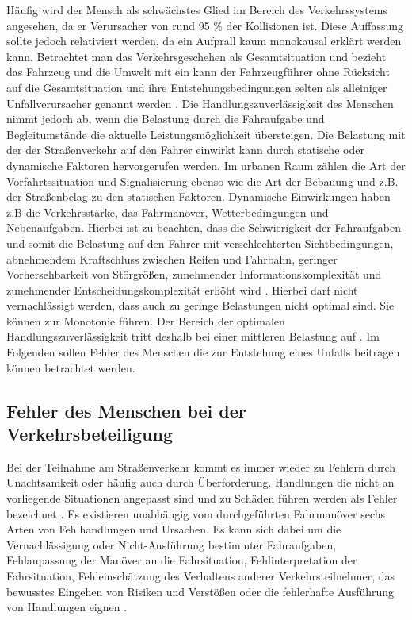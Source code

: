 Häufig wird der Mensch als schwächstes Glied im Bereich des Verkehrssystems angesehen, da er Verursacher von rund 95 \% der Kollisionen ist. Diese Auffassung sollte jedoch relativiert werden, da ein Aufprall kaum monokausal erklärt werden kann. Betrachtet man das Verkehrsgeschehen als Gesamtsituation und bezieht das Fahrzeug und die Umwelt mit ein kann der Fahrzeugführer ohne Rücksicht auf die Gesamtsituation und ihre Entstehungsbedingungen selten als alleiniger Unfallverursacher genannt werden \parencite[S. 269]{Burg.2017}. Die Handlungszuverlässigkeit des Menschen nimmt jedoch ab, wenn die Belastung durch die Fahraufgabe und Begleitumstände die aktuelle Leistungsmöglichkeit übersteigen. Die Belastung mit der der Straßenverkehr auf den Fahrer einwirkt kann durch statische oder dynamische Faktoren hervorgerufen werden. Im urbanen Raum zählen die Art der Vorfahrtssituation und Signalisierung ebenso wie die Art der Bebauung und z.B. der Straßenbelag zu den statischen Faktoren. Dynamische Einwirkungen haben z.B die Verkehrsstärke, das Fahrmanöver, Wetterbedingungen und Nebenaufgaben. Hierbei ist zu beachten, dass die Schwierigkeit der Fahraufgaben und somit die Belastung auf den Fahrer mit verschlechterten Sichtbedingungen, abnehmendem Kraftschluss zwischen Reifen und Fahrbahn, geringer Vorhersehbarkeit von Störgrößen, zunehmender Informationskomplexität und zunehmender Entscheidungskomplexität erhöht wird \parencite[S. 132]{Reichart.2001}. Hierbei darf nicht vernachlässigt werden, dass auch zu geringe Belastungen nicht optimal sind. Sie können zur Monotonie führen. Der Bereich der optimalen Handlungszuverlässigkeit tritt deshalb bei einer mittleren Belastung auf \parencite[S. 270]{Burg.2017}. Im Folgenden sollen Fehler des Menschen die zur Entstehung eines Unfalls beitragen können betrachtet werden.

\subsection{Fehler des Menschen bei der Verkehrsbeteiligung}\label{Fehler des Menschen bei der Verkehrsbeteiligung}
Bei der Teilnahme am Straßenverkehr kommt es immer wieder zu Fehlern durch Unachtsamkeit oder häufig auch durch Überforderung. Handlungen die nicht an vorliegende Situationen angepasst sind und zu Schäden führen werden als Fehler bezeichnet \parencite[S. 17]{Gerstenberger.17.02.2015}. Es existieren unabhängig vom durchgeführten Fahrmanöver sechs Arten von Fehlhandlungen und Ursachen. Es kann sich dabei um die Vernachlässigung oder Nicht-Ausführung bestimmter Fahraufgaben, Fehlanpassung der Manöver an die Fahrsituation, Fehlinterpretation der Fahrsituation, Fehleinschätzung des Verhaltens anderer Verkehrsteilnehmer,  das bewusstes Eingehen von Risiken und Verstößen oder die fehlerhafte Ausführung von Handlungen eignen \parencite[S. 32f]{Vollrath.2006}. %

